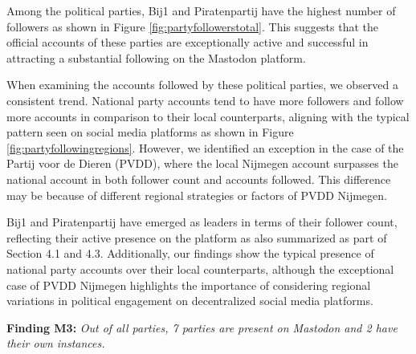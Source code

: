 Among the political parties, Bij1 and Piratenpartij have the highest number of followers as shown in Figure \ref{fig:partyfollowerstotal}. This suggests that the official accounts of these parties are exceptionally active and successful in attracting a substantial following on the Mastodon platform.

When examining the accounts followed by these political parties, we observed a consistent trend. National party accounts tend to have more followers and follow more accounts in comparison to their local counterparts, aligning with the typical pattern seen on social media platforms as shown in Figure \ref{fig:partyfollowingregions}. However, we identified an exception in the case of the Partij voor de Dieren (PVDD), where the local Nijmegen account surpasses the national account in both follower count and accounts followed. This difference may be because of different regional strategies or factors of PVDD Nijmegen.

Bij1 and Piratenpartij have emerged as leaders in terms of their follower count, reflecting their active presence on the platform as also summarized as part of Section 4.1 and 4.3. Additionally, our findings show the typical presence of national party accounts over their local counterparts, although the exceptional case of PVDD Nijmegen highlights the importance of considering regional variations in political engagement on decentralized social media platforms.

\textbf{Finding M3:} \textit{Out of all parties, 7 parties are present on Mastodon and 2 have their own instances.}
